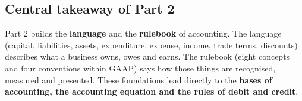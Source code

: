 \documentclass[11pt,a4paper]{article}
\begin{document}
\subsection{Central takeaway of Part 2}

\begin{keybox}
Part 2 builds the \textbf{language} and the \textbf{rulebook} of accounting. The language (capital, liabilities, assets,
expenditure, expense, income, trade terms, discounts) describes what a business owns, owes and earns. The rulebook
(eight concepts and four conventions within GAAP) says how those things are recognised, measured and presented. These
foundations lead directly to the \textbf{bases of accounting, the accounting equation and the rules of debit and credit}.
\end{keybox}
\end{document}
